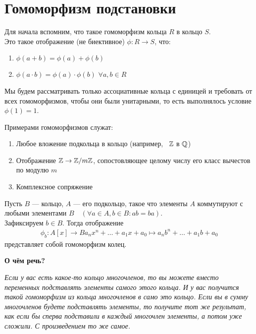 \section{Гомоморфизм подстановки}
\begin{normalsize}
    Для начала вспомним, что такое гомоморфизм кольца $R$ в кольцо $S$. \\
    Это такое отображение (не биективное) $\phi: R \rightarrow S$, что:
    \begin{enumerate}
        \item $\phi(a + b) = \phi(a) + \phi(b)$
        \item $\phi(a\cdot b) = \phi(a) \cdot \phi(b)$
        $\forall a,b \in R$
    \end{enumerate}
    Мы будем рассматривать только ассоциативные кольца с единицей и требовать
    от всех гомоморфизмов, чтобы они были унитарными, то есть выполнялось
    условие $\phi(1) = 1$.
    
    Примерами гомоморфизмов служат:
    \begin{enumerate}
        \item Любое вложение подкольца в кольцо (например,  $\mathbb{Z}$ в $\mathbb{Q}$)
        \item Отображение $\mathbb{Z} \rightarrow \mathbb{Z} /m\mathbb{Z}$, сопостовляющее целому числу
        его класс вычестов по модулю $m$
        \item Комплексное сопряжение
    \end{enumerate}

    \begin{theorem-non}
        Пусть $B$ --- кольцо, $A$ --- его подкольцо, такое что элементы
        $A$ коммутируют с любыми элементами $B\quad (\forall a \in A, b \in B: ab = ba)$. \\
        Зафиксируем $b \in B$. Тогда отображение
        \begin{align*}
            \phi_b: A[x] \rightarrow B
            a_nx^n + \dots + a_1x + a_0 \mapsto a_nb^n + \dots + a_1b + a_0
        \end{align*}
        представляет собой гомоморфизм колец.
    \end{theorem-non}

    \textbf{О чём речь?}

    \emph{Если у вас есть какое-то кольцо многочленов, то вы можете вместо переменных
    подставлять элементы самого этого кольца. И у вас получится такой гомоморфизм из
    кольца многочленов в само это кольцо. Если вы в сумму многочленов будете подставлять элементы,
    то получите тот же результат, как если бы сперва подставили в каждый многочлен элементы,
    а потом уже сложили. С произведением то же самое.} \\
    

\end{normalsize}
